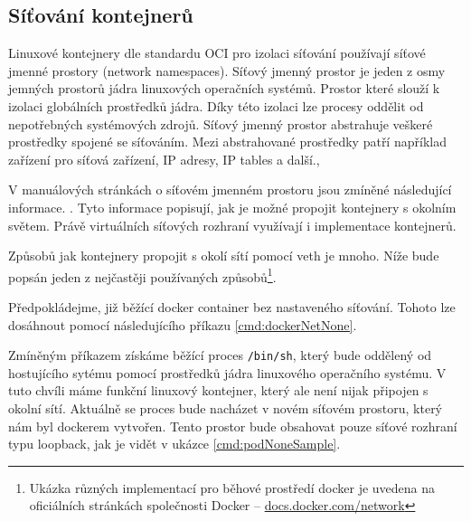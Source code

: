 \subsection{Síťování kontejnerů}\label{sitovaniKon}
Linuxové kontejnery dle standardu OCI pro izolaci síťování používají síťové jmenné prostory (network namespaces).
Síťový jmenný prostor je jeden z osmy jemných prostorů jádra linuxových operačních systémů. Prostor které slouží k izolaci globálních prostředků jádra. Díky této izolaci lze procesy oddělit od nepotřebných systémových zdrojů. Síťový jmenný prostor abstrahuje veškeré prostředky spojené se síťováním. Mezi abstrahované prostředky patří například zařízení pro síťová zařízení, IP adresy, IP tables a další.\cite{thelinuxmanpagesproject_2022_namespaces7},\cite{thelinuxmanpagesproject_2022_network_namespaces7}

V manuálových stránkách o síťovém jmenném prostoru jsou zmíněné následující informace.  .\cite{thelinuxmanpagesproject_2022_network_namespaces7} Tyto informace popisují, jak je možné propojit kontejnery s okolním světem. Právě virtuálních síťových rozhraní využívají i implementace kontejnerů.    

Způsobů jak kontejnery propojit s okolí sítí pomocí veth je mnoho. Níže bude popsán jeden z nejčastěji používaných způsobů\footnote{Ukázka různých implementací pro běhové prostředí docker je uvedena na oficiálních stránkách společnosti Docker -- \href{https://docs.docker.com/network/}{docs.docker.com/network}}.

Předpokládejme, již běžící docker container bez nastaveného síťování. Tohoto lze dosáhnout pomocí následujícího příkazu \ref{cmd:dockerNetNone}.


Zmíněným příkazem získáme běžící proces \verb|/bin/sh|, který bude oddělený od hostujícího sytému pomocí prostředků jádra linuxového operačního systému. V tuto chvíli máme funkční linuxový kontejner, který ale není nijak připojen s okolní sítí. Aktuálně se proces bude nacházet v novém síťovém prostoru, který nám byl dockerem vytvořen. Tento prostor bude obsahovat pouze síťové rozhraní typu loopback, jak je vidět v ukázce \ref{cmd:podNoneSample}. 



